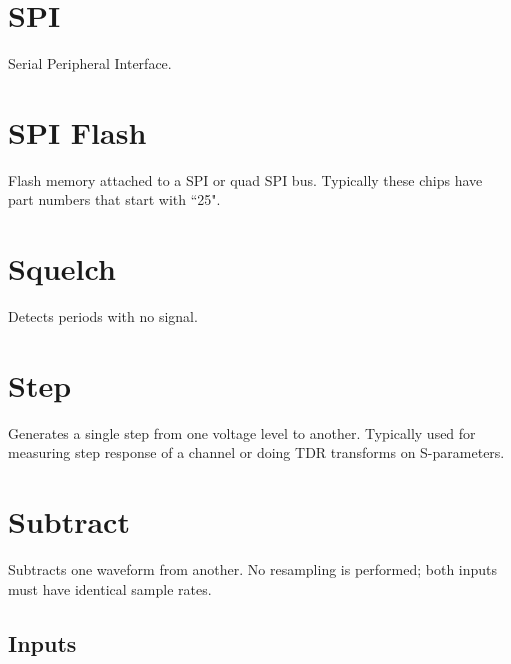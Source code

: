 \pagebreak
\section{SPI}

Serial Peripheral Interface.

\pagebreak
\section{SPI Flash}

Flash memory attached to a SPI or quad SPI bus. Typically these chips have part numbers that start with ``25".

\pagebreak
\section{Squelch}

Detects periods with no signal.

\pagebreak
\section{Step}

Generates a single step from one voltage level to another. Typically used for measuring step response of a channel or
doing TDR transforms on S-parameters.

\pagebreak
\section{Subtract}


Subtracts one waveform from another. No resampling is performed; both inputs must have identical sample rates.

\subsection{Inputs}

